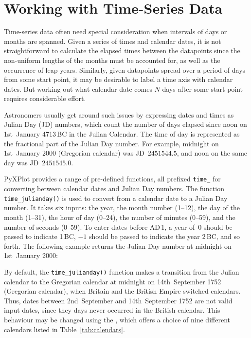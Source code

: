 \section{Working with Time-Series Data}
\label{sec:time_series}

Time-series data often need special consideration when intervals of days or
months are spanned. Given a series of times and calendar dates, it is not
straightforward to calculate the elapsed times between the datapoints since
the non-uniform lengths of the months must be accounted for, as well as the
occurrence of leap years. Similarly, given datapoints spread over a period of
days from some start point, it may be desirable to label a time axis with
calendar dates. But working out what calendar date comes $N$ days after some
start point requires considerable effort.

Astronomers usually get around such issues by expressing dates and times as
Julian Day (JD) numbers, which count the number of
days elapsed since noon on 1st~January 4713\,{\footnotesize BC} in the Julian
Calendar. The time of day is represented as the fractional part of the Julian
Day number. For example, midnight on 1st~January 2000 (Gregorian calendar) was
JD~$2451544.5$, and noon on the same day was JD~$2451545.0$.

PyXPlot provides a range of pre-defined functions, all prefixed {\tt time\_}
for converting between calendar dates and Julian Day numbers. The function {\tt
time\_julianday()} is used to convert from a calendar
date to a Julian Day number. It takes six inputs: the year, the month number
(1--12), the day of the month (1--31), the hour of day (0--24), the number of
minutes (0--59), and the number of seconds (0--59). To enter dates before
{\footnotesize AD}\,1, a year of~$0$ should be passed to indicate
1\,{\footnotesize BC}, $-1$ should be passed to indicate the year
2\,{\footnotesize BC}, and so forth. The following example returns the Julian
Day number at midnight on 1st~January 2000:

\vspace{3mm}
\newline
{}
\vspace{3mm}

By default, the {\tt time\_julianday()} function makes a transition from the
Julian calendar to the Gregorian calendar at midnight on 14th~September 1752
(Gregorian calendar), when Britain and the British Empire switched calendars.
Thus, dates between 2nd~September and 14th~September 1752 are not valid input
dates, since they days never occurred in the British calendar. This behaviour
may be changed using the , which offers a choice of nine
different calendars listed in Table~\ref{tab:calendars}.

